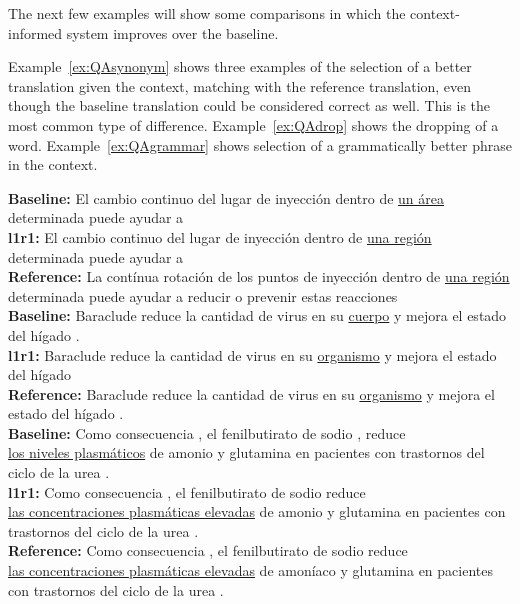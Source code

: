 The next few examples will show some comparisons in which the context-informed
system improves over the baseline. 

Example~\ref{ex:QAsynonym} shows three examples of the selection of a better
translation given the context, matching with the reference translation, even
though the baseline translation could be considered correct as well. This is
the most common type of difference. Example~\ref{ex:QAdrop} shows the dropping
of a word. Example~\ref{ex:QAgrammar} shows selection of a grammatically better
phrase in the context.


\begin{exe}
\footnotesize
\ex \textbf{Baseline:} El cambio continuo del lugar de inyección dentro de \underline{un área} determinada puede ayudar a \\
\textbf{l1r1:} El cambio continuo del lugar de inyección dentro de \underline{una región} determinada puede ayudar a \\
\textbf{Reference:} La contínua rotación de los puntos de inyección dentro de \underline{una región} determinada puede ayudar a reducir o prevenir estas reacciones \\
\noindent\makebox[\linewidth]{\rule{\linewidth}{0.4pt}}
\textbf{Baseline:} Baraclude reduce la cantidad de virus en su \underline{cuerpo} y mejora el estado del hígado . \\
\textbf{l1r1:} Baraclude reduce la cantidad de virus en su \underline{organismo} y mejora el estado del hígado  \\
\textbf{Reference:} Baraclude reduce la cantidad de virus en su \underline{organismo} y mejora el estado del hígado .
\\ 
\noindent\makebox[\linewidth]{\rule{\linewidth}{0.4pt}}
\textbf{Baseline:} Como consecuencia , el fenilbutirato de sodio , reduce \\  \underline{los niveles plasmáticos} de amonio y glutamina en pacientes con trastornos del ciclo de la urea . \\
\textbf{l1r1:} Como consecuencia , el fenilbutirato de sodio reduce \\ \underline{las concentraciones plasmáticas elevadas} de amonio y glutamina en pacientes con trastornos del ciclo de la urea .  \\
\textbf{Reference:} Como consecuencia , el fenilbutirato de sodio reduce \\ \underline{las concentraciones plasmáticas elevadas} de amoníaco y glutamina en pacientes con trastornos del ciclo de la urea .
\label{ex:QAsynonym}
\end{exe}

